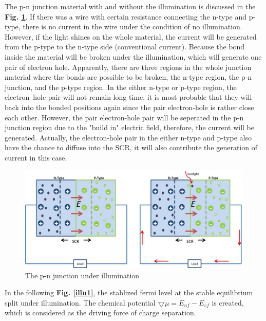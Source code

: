 \documentclass[a4paper, 12pt, titlepage,oneside,drop]{kthesis}
\begin{document}
The p-n junction material with and without the illumination is discussed in the \textbf{Fig. \ref{illu}}. If there was a wire with certain resistance connecting the n-type and p-type, there is no current in the wire under the condition of no illumination. However, if the light shines on the whole material, the current will be generated from the 
p-type to the n-type side (conventional current). Because the bond inside the material will be broken under the illumination, which will generate one pair of electron hole. Apparently, there are three regions in the whole junction material where the bonds are possible to be broken, the n-type region, the p-n junction, and
the p-type region. In the either n-type or p-type region, the electron–hole pair will not remain long time,  it is most probable that they will back into the bonded positions again since the pair electron-hole is rather close each other. However, the pair
electron-hole pair will be seperated in the p-n junction region due to the "build in" electric field, therefore, the current will be generated. Actually, the electron-hole pair in the either n-type and p-type also have the chance to diffuse into 
the SCR, it will also contribute the generation of current in this case.

\begin{figure}[H]
\centering
\includegraphics[scale=0.5]{illumination.jpg}
\caption{The p-n junction under illumination}
\label{illu}
\end{figure}

In the following \textbf{Fig. \ref{illu1}}, the stablized fermi level at the stable equilibrium split under illumination.  The chemical potential $\bigtriangledown \mu = E_{nf} - E_{vf}$ is created, which is considered as the driving force of charge separation.
\end{document}
